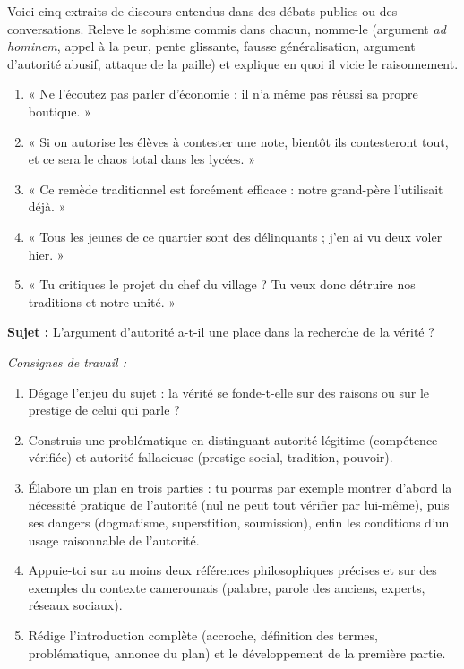 \documentclass[11pt]{article}
\newcounter{popsec}
\newcounter{popsub}
\newcommand{\courssub}[1]{%
  \stepcounter{popsub}%
  \par\vspace{9pt}\noindent{\popxbold\fontsize{11.5}{13}\selectfont\color{popink}{\color{poporange}\thepopsec.\thepopsub}\hspace{6pt}#1}\par\nopagebreak\vspace{4pt}
}
\begin{document}
\begin{exercice}
Voici cinq extraits de discours entendus dans des débats publics ou des conversations. Releve le sophisme commis dans chacun, nomme-le (argument \emph{ad hominem}, appel à la peur, pente glissante, fausse généralisation, argument d'autorité abusif, attaque de la paille) et explique en quoi il vicie le raisonnement.
\begin{enumerate}
\item « Ne l'écoutez pas parler d'économie : il n'a même pas réussi sa propre boutique. »
\item « Si on autorise les élèves à contester une note, bientôt ils contesteront tout, et ce sera le chaos total dans les lycées. »
\item « Ce remède traditionnel est forcément efficace : notre grand-père l'utilisait déjà. »
\item « Tous les jeunes de ce quartier sont des délinquants ; j'en ai vu deux voler hier. »
\item « Tu critiques le projet du chef du village ? Tu veux donc détruire nos traditions et notre unité. »
\end{enumerate}
\end{exercice}

\courssub{Je me prépare au Bac}

\begin{exercice}
\textbf{Sujet :} L'argument d'autorité a-t-il une place dans la recherche de la vérité ?

\emph{Consignes de travail :}
\begin{enumerate}
\item Dégage l'enjeu du sujet : la vérité se fonde-t-elle sur des raisons ou sur le prestige de celui qui parle ?
\item Construis une problématique en distinguant autorité légitime (compétence vérifiée) et autorité fallacieuse (prestige social, tradition, pouvoir).
\item Élabore un plan en trois parties : tu pourras par exemple montrer d'abord la nécessité pratique de l'autorité (nul ne peut tout vérifier par lui-même), puis ses dangers (dogmatisme, superstition, soumission), enfin les conditions d'un usage raisonnable de l'autorité.
\item Appuie-toi sur au moins deux références philosophiques précises et sur des exemples du contexte camerounais (palabre, parole des anciens, experts, réseaux sociaux).
\item Rédige l'introduction complète (accroche, définition des termes, problématique, annonce du plan) et le développement de la première partie.
\end{enumerate}
\end{exercice}
\end{document}
